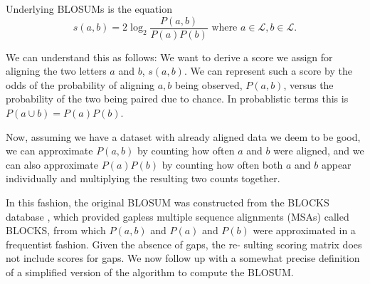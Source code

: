\documentclass{article}
\begin{document}
Underlying BLOSUMs is the equation
\begin{equation*}
	s(a, b)= 2 \log_2 \frac{P(a, b)}{P(a)P(b)} \text{ where } a  \in \mathcal L, b \in \mathcal L.
\end{equation*}

We can understand this as follows: We want to derive a score we assign
for aligning the two letters $a$ and $b$, $s(a,b)$. We can represent such
a score by the odds of the probability of aligning $a, b$ being observed,
$P(a, b)$, versus the probability of the two being paired due to chance. In probablistic terms this is $P(a \cup b) = P(a)P(b)$.

Now, assuming we have a dataset with already aligned data we deem to be good, we
can approximate $P(a, b)$ by counting how often $a$ and $b$ were aligned, and
we can also approximate $P(a)P(b)$ by counting how often both $a$ and $b$ appear
individually and multiplying the resulting two counts together.

In this fashion, the original BLOSUM was constructed
from the BLOCKS database \cite{henikoffAutomatedAssemblyProtein1991}, which provided gapless multiple sequence alignments (MSAs) called BLOCKS, frrom which $P(a,b)$ and $P(a)$ and $P(b)$ were approximated in a frequentist fashion. Given the absence of gaps, the re-
sulting scoring matrix does not include scores for gaps. We
now follow up with a somewhat precise definition of a simplified version of the algorithm to compute the BLOSUM.
\end{document}
